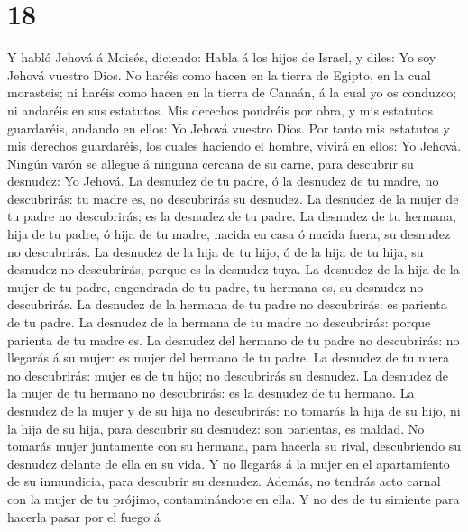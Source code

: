 \hypertarget{section-17}{%
\section{18}\label{section-17}}

 Y habló Jehová á Moisés, diciendo:  Habla á los
hijos de Israel, y diles: Yo soy Jehová vuestro Dios.  No
haréis como hacen en la tierra de Egipto, en la cual morasteis; ni
haréis como hacen en la tierra de Canaán, á la cual yo os conduzco; ni
andaréis en sus estatutos.  Mis derechos pondréis por obra,
y mis estatutos guardaréis, andando en ellos: Yo Jehová vuestro Dios.
 Por tanto mis estatutos y mis derechos guardaréis, los
cuales haciendo el hombre, vivirá en ellos: Yo Jehová. 
Ningún varón se allegue á ninguna cercana de su carne, para descubrir su
desnudez: Yo Jehová.  La desnudez de tu padre, ó la desnudez
de tu madre, no descubrirás: tu madre es, no descubrirás su desnudez.
 La desnudez de la mujer de tu padre no descubrirás; es la
desnudez de tu padre.  La desnudez de tu hermana, hija de tu
padre, ó hija de tu madre, nacida en casa ó nacida fuera, su desnudez no
descubrirás.  La desnudez de la hija de tu hijo, ó de la
hija de tu hija, su desnudez no descubrirás, porque es la desnudez tuya.
 La desnudez de la hija de la mujer de tu padre, engendrada
de tu padre, tu hermana es, su desnudez no descubrirás.  La
desnudez de la hermana de tu padre no descubrirás: es parienta de tu
padre.  La desnudez de la hermana de tu madre no
descubrirás: porque parienta de tu madre es.  La desnudez
del hermano de tu padre no descubrirás: no llegarás á su mujer: es mujer
del hermano de tu padre.  La desnudez de tu nuera no
descubrirás: mujer es de tu hijo; no descubrirás su desnudez.
 La desnudez de la mujer de tu hermano no descubrirás: es
la desnudez de tu hermano.  La desnudez de la mujer y de su
hija no descubrirás: no tomarás la hija de su hijo, ni la hija de su
hija, para descubrir su desnudez: son parientas, es maldad.
 No tomarás mujer juntamente con su hermana, para hacerla
su rival, descubriendo su desnudez delante de ella en su vida.
 Y no llegarás á la mujer en el apartamiento de su
inmundicia, para descubrir su desnudez.  Además, no tendrás
acto carnal con la mujer de tu prójimo, contaminándote en ella.
 Y no des de tu simiente para hacerla pasar por el fuego á
